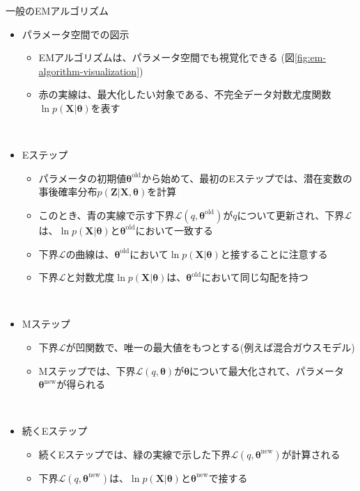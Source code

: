 \documentclass[dvipdfmx,notheorems,t]{beamer}
\begin{document}
\begin{frame}{一般のEMアルゴリズム}

\begin{itemize}
	\item パラメータ空間での図示
	\begin{itemize}
		\item EMアルゴリズムは、パラメータ空間でも視覚化できる (図\ref{fig:em-algorithm-visualization})
		\newline
		\item \color{red}赤の実線\normalcolor は、最大化したい対象である、不完全データ対数尤度関数$\ln p(\bm{X} | \bm{\theta})$を表す
	\end{itemize} \
	
	\item Eステップ
	\begin{itemize}
		\item パラメータの初期値$\bm{\theta}^\mathrm{old}$から始めて、最初のEステップでは、潜在変数の事後確率分布$p(\bm{Z} | \bm{X}, \bm{\theta})$を計算
		\item このとき、\color{blue}青の実線\normalcolor で示す下界$\mathcal{L}(q, \bm{\theta}^\mathrm{old})$が$q$について更新され、下界$\mathcal{L}$は、$\ln p(\bm{X} | \bm{\theta})$と$\bm{\theta}^\mathrm{old}$において一致する
		\newline
		\item 下界$\mathcal{L}$の曲線は、$\bm{\theta}^\mathrm{old}$において$\ln p(\bm{X} | \bm{\theta})$と\alert{接する}ことに注意する
		\item 下界$\mathcal{L}$と対数尤度$\ln p(\bm{X} | \bm{\theta})$は、$\bm{\theta}^\mathrm{old}$において\alert{同じ勾配を持つ}
	\end{itemize} \
	
	\item Mステップ
	\begin{itemize}
		\item 下界$\mathcal{L}$が\alert{凹関数}で、唯一の最大値をもつとする(例えば混合ガウスモデル)
		\item Mステップでは、下界$\mathcal{L}(q, \bm{\theta})$が$\bm{\theta}$について最大化されて、パラメータ$\bm{\theta}^\mathrm{new}$が得られる
	\end{itemize} \
	
	\item 続くEステップ
	\begin{itemize}
		\item 続くEステップでは、\color{green}緑の実線\normalcolor で示した下界$\mathcal{L}(q, \bm{\theta}^\mathrm{new})$が計算される
		\item 下界$\mathcal{L}(q, \bm{\theta}^\mathrm{new})$は、$\ln p(\bm{X} | \bm{\theta})$と$\bm{\theta}^\mathrm{new}$で接する
	\end{itemize}
\end{itemize}

\end{frame}
\end{document}
